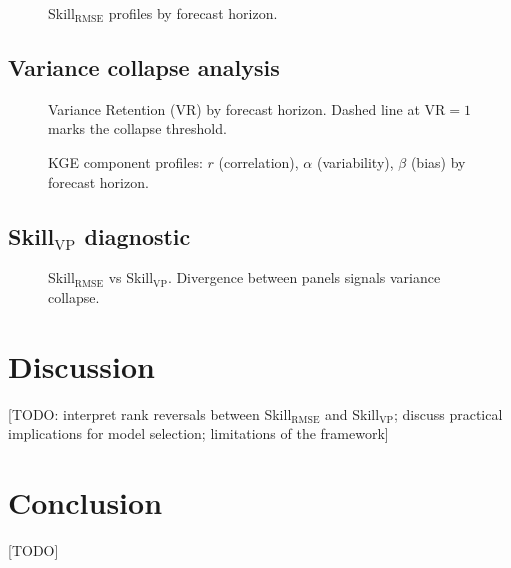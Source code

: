 \documentclass[11pt,a4paper]{article}
\begin{document}
\begin{figure}[H]
  \centering
  \caption{Skill$_{\mathrm{RMSE}}$ profiles by forecast horizon.}
  \label{fig:skill_rmse}
\end{figure}

\subsection{Variance collapse analysis}

\begin{figure}[H]
  \centering
  \caption{Variance Retention (VR) by forecast horizon.
           Dashed line at VR$=1$ marks the collapse threshold.}
  \label{fig:vr}
\end{figure}

\begin{figure}[H]
  \centering
  \caption{KGE component profiles: $r$ (correlation), $\alpha$ (variability),
           $\beta$ (bias) by forecast horizon.}
  \label{fig:kge_comp}
\end{figure}

\subsection{Skill$_{\mathrm{VP}}$ diagnostic}

\begin{figure}[H]
  \centering
  \caption{Skill$_{\mathrm{RMSE}}$ vs Skill$_{\mathrm{VP}}$.
           Divergence between panels signals variance collapse.}
  \label{fig:skill_vp}
\end{figure}

\section{Discussion}\label{sec:discussion}

[TODO: interpret rank reversals between Skill$_{\mathrm{RMSE}}$ and
Skill$_{\mathrm{VP}}$; discuss practical implications for model selection;
limitations of the framework]

\section{Conclusion}\label{sec:conclusion}

[TODO]



\end{document}
